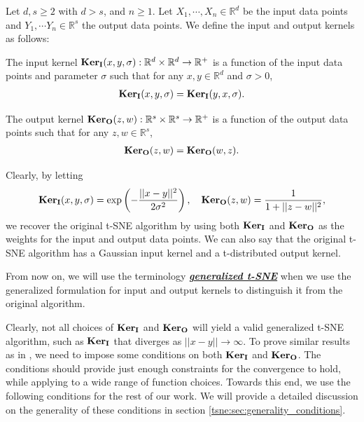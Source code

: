 Let $d,s \geq 2$ with $d>s$, and $n \geq 1$. Let $X_1, \cdots, X_n \in
    \mathbb{R}^d$ be the input data points and $Y_1, \cdots Y_n \in \mathbb{R}^s$
the output data points. We define the input and output kernels as follows:
\begin{definition}  \label{def:input_kernel}
    The input kernel $\mathbf{Ker}_{\mathbf{I}}(x,y,\sigma): \mathbb{R}^d  \times \mathbb{R}^d \to \mathbb{R}^+$ is a function of the input data points and parameter $\sigma$ such that for any $x,y \in \mathbb{R}^d$ and $\sigma > 0$,
    \begin{align}
        \mathbf{Ker}_{\mathbf{I}}(x,y,\sigma)=\mathbf{Ker}_{\mathbf{I}}(y,x,\sigma).
    \end{align}
\end{definition}
\begin{definition}  \label{def:output_kernel}
    The output kernel $\mathbf{Ker}_{\mathbf{O}}(z,w):\mathbb{R}^s \times \mathbb{R}^s \to \mathbb{R}^+$ is a function of the output data points such that for any $z,w \in \mathbb{R}^s$,
    \begin{align}
        \mathbf{Ker}_{\mathbf{O}}(z,w)=\mathbf{Ker}_{\mathbf{O}}(w,z).
    \end{align}
\end{definition}
Clearly, by letting
\begin{align}
    \mathbf{Ker}_{\mathbf{I}}(x,y,\sigma)=\exp\left(-\frac{||x-y||^2}{2\sigma^2}\right), \quad \mathbf{Ker}_{\mathbf{O}}(z,w)=\frac{1}{1+||z-w||^2},
\end{align}
we recover the original t-SNE algorithm by using both $\mathbf{Ker}_{\mathbf{I}}$ and $\mathbf{Ker}_{\mathbf{O}}$ as the weights for the input and output data points. We can also say that the original t-SNE algorithm has a Gaussian input kernel and a t-distributed output kernel.

From now on, we will use the terminology \underline{\textbf{\textit{generalized
            t-SNE}}} when we use the generalized formulation for input and output kernels
to distinguish it from the original algorithm.

Clearly, not all choices of $\mathbf{Ker}_{\mathbf{I}}$ and $\mathbf{Ker}_{\mathbf{O}}$ will yield a valid generalized
t-SNE algorithm, such as $\mathbf{Ker}_{\mathbf{I}}$ that diverges as $||x-y|| \to \infty$. To prove
similar results as in \cite{auffinger-tsne}, we need to impose some conditions
on both $\mathbf{Ker}_{\mathbf{I}}$ and $\mathbf{Ker}_{\mathbf{O}}$. The conditions should provide just enough constraints
for the convergence to hold, while applying to a wide range of function
choices. Towards this end, we use the following conditions for the rest of our
work. We will provide a detailed discussion on the generality of these
conditions in section \ref{tsne:sec:generality_conditions}.

